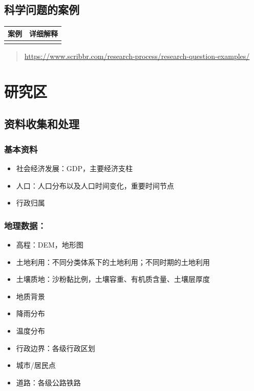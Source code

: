 \documentclass[
]{ctexbook}
\providecommand{\tightlist}{%
  \setlength{\itemsep}{0pt}\setlength{\parskip}{0pt}}
\begin{document}
\hypertarget{ux79d1ux5b66ux95eeux9898ux7684ux6848ux4f8b}{%
\subsection{科学问题的案例}\label{ux79d1ux5b66ux95eeux9898ux7684ux6848ux4f8b}}

\begin{longtable}[]{@{}cc@{}}
\toprule\noalign{}
案例 & 详细解释 \\
\midrule\noalign{}
\endhead
\bottomrule\noalign{}
\endlastfoot
& \\
\end{longtable}

\begin{quote}
\url{https://www.scribbr.com/research-process/research-question-examples/}
\end{quote}

\hypertarget{ux7814ux7a76ux533a}{%
\section{研究区}\label{ux7814ux7a76ux533a}}

\hypertarget{ux8d44ux6599ux6536ux96c6ux548cux5904ux7406}{%
\subsection{资料收集和处理}\label{ux8d44ux6599ux6536ux96c6ux548cux5904ux7406}}

\hypertarget{ux57faux672cux8d44ux6599}{%
\subsubsection{基本资料}\label{ux57faux672cux8d44ux6599}}

\begin{itemize}
\tightlist
\item
  社会经济发展：GDP，主要经济支柱
\item
  人口：人口分布以及人口时间变化，重要时间节点
\item
  行政归属
\end{itemize}

\hypertarget{ux5730ux7406ux6570ux636e}{%
\subsubsection{地理数据：}\label{ux5730ux7406ux6570ux636e}}

\begin{itemize}
\tightlist
\item
  高程：DEM，地形图
\item
  土地利用：不同分类体系下的土地利用；不同时期的土地利用
\item
  土壤质地：沙粉黏比例，土壤容重、有机质含量、土壤层厚度
\item
  地质背景
\item
  降雨分布
\item
  温度分布
\item
  行政边界：各级行政区划
\item
  城市/居民点
\item
  道路：各级公路铁路
\end{itemize}
\end{document}
